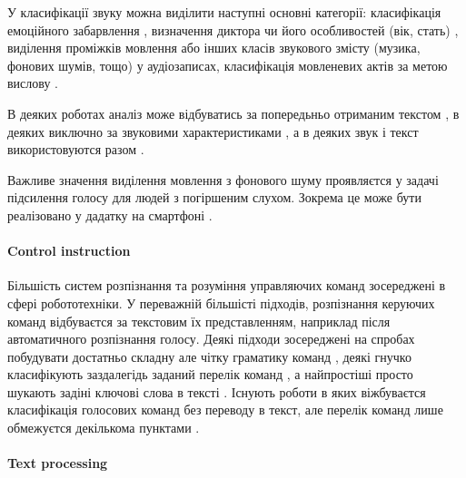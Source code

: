 У класифікації звуку можна виділити наступні основні категорії: класифікація емоційного забарвлення \cite{Ververidis_2004,Ververidis_2004_2,Ververidis_2006,Kaya_2017,Deb_2016,Bhaskar_2015,Devillers_2015,Weisskirchen_2017,Sharma_2018,Ozseven_2018}, визначення диктора \cite{Rabotyagov_2006} чи його особливостей (вік, стать) \cite{Kaya_2017}, виділення проміжків мовлення \cite{Hussain_2018,Khonglah_2016,Benatan_2015,Priya_2012} або інших класів звукового змісту (музика, фонових шумів, тощо) \cite{Hussain_2018,Boddapati_2017} у аудіозаписах, класифікація мовленевих актів за метою вислову \cite{Ko_2015,Choi_1999,Grosz_1995,En_2005,Kang_2013,Kim_2012,Lee_2002,Sridhar_2008,Webb_2005,Kang_2010,Hellbernd_2016,Su_2017}.

В деяких роботах аналіз може відбуватись за попередьньо отриманим текстом \cite{Ko_2015,Choi_1999,Grosz_1995,En_2005,Kang_2013,Kim_2012,Lee_2002,Webb_2005,Kang_2010}, в деяких виключно за звуковими характеристиками \cite{Ververidis_2004,Ververidis_2004_2,Ververidis_2006,Kaya_2017,Deb_2016,Devillers_2015,Weisskirchen_2017,Sharma_2018,Hussain_2018,Khonglah_2016,Benatan_2015,Priya_2012,Boddapati_2017,Hellbernd_2016}, а в деяких звук і текст використовуются разом \cite{Bhaskar_2015,Sridhar_2008,Chowdhury_2018}.

Важливе значення виділення мовлення з фонового шуму проявляєтся у задачі підсилення голосу для людей з погіршеним слухом. Зокрема це може бути реалізовано у дадатку на смартфоні \cite{Vashkevich_2018}.

\paragraph{Control instruction}

Більшість систем розпізнання та розуміння управляючих команд зосереджені в сфері робототехніки. У переважній більшісті підходів, розпізнання керуючих команд відбуваєтся за текстовим їх представленням, наприклад після автоматичного розпізнання голосу. Деякі підходи зосереджені на спробах побудувати достатньо складну але чітку граматику команд \cite{Misra_2016,Fasola_2013,Eppe_2016}, деякі гнучко класифікують заздалегідь заданий перелік команд \cite{Yongda_2018}, а найпростіші просто шукають задіні ключові слова в тексті \cite{Shwe_2003,Shulika_2018}. Існують роботи в яких віжбуваєтся класифікація голосових команд без переводу в текст, але перелік команд лише обмежуєтся декількома пунктами \cite{Shulika_2018,Gryshchuk_2006}.

\paragraph{Text processing}


